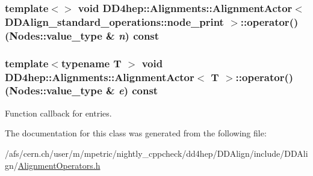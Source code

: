 \label{class_d_d4hep_1_1_alignments_1_1_alignment_actor_a35e891dcac2dff5df02eb6d47aa00104}
\hypertarget{class_d_d4hep_1_1_alignments_1_1_alignment_actor_a0cb93f75530d12e2c9ed594a3858bb0a}{
\subsubsection[{operator()}]{\setlength{\rightskip}{0pt plus 5cm}template$<$$>$ void {\bf DD4hep::Alignments::AlignmentActor}$<$ DDAlign\_\-standard\_\-operations::node\_\-print $>$::operator() (Nodes::value\_\-type \& {\em n}) const}}
\label{class_d_d4hep_1_1_alignments_1_1_alignment_actor_a0cb93f75530d12e2c9ed594a3858bb0a}
\hypertarget{class_d_d4hep_1_1_alignments_1_1_alignment_actor_a5de694318f060574c5c2ec4d5f3ee8f1}{
\subsubsection[{operator()}]{\setlength{\rightskip}{0pt plus 5cm}template$<$typename T $>$ void {\bf DD4hep::Alignments::AlignmentActor}$<$ {\bf T} $>$::operator() (Nodes::value\_\-type \& {\em e}) const}}
\label{class_d_d4hep_1_1_alignments_1_1_alignment_actor_a5de694318f060574c5c2ec4d5f3ee8f1}


Function callback for entries. 

The documentation for this class was generated from the following file:\begin{DoxyCompactItemize}
\item 
/afs/cern.ch/user/m/mpetric/nightly\_\-cppcheck/dd4hep/DDAlign/include/DDAlign/\hyperlink{_alignment_operators_8h}{AlignmentOperators.h}\end{DoxyCompactItemize}
